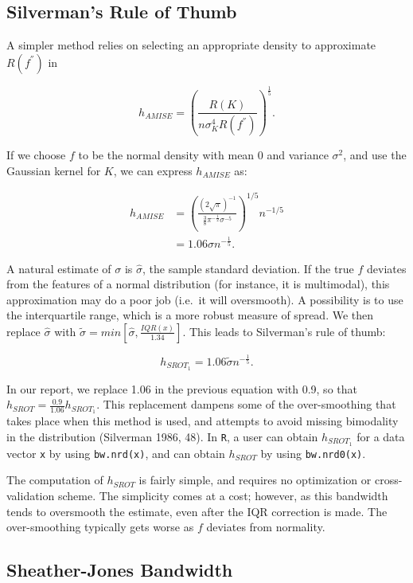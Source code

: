 \documentclass[]{article}
\begin{document}
\subsection{Silverman's Rule of Thumb}\label{silvermans-rule-of-thumb}

A simpler method relies on selecting an appropriate density to
approximate \(R(f^{''})\) in

\[
h_{AMISE} = \left(\frac{R(K)}{n\sigma_K^4R(f^{''})}\right)^{\frac{1}{5}}.
\]

If we choose \(f\) to be the normal density with mean 0 and variance
\(\sigma^2\), and use the Gaussian kernel for \(K\), we can express
\(h_{AMISE}\) as:

\[
\begin{aligned}
h_{AMISE} &= \left(\frac{(2\sqrt{\pi})^{-1}}{\frac{3}{8}\pi^{-\frac{1}{2}}\sigma^{-5}}\right)^{1/5} n^{-1/5} \\
&= 1.06\sigma n^{-\frac{1}{5}}.
\end{aligned}
\]

A natural estimate of \(\sigma\) is \(\hat{\sigma}\), the sample
standard deviation. If the true \(f\) deviates from the features of a
normal distribution (for instance, it is multimodal), this approximation
may do a poor job (i.e.~it will oversmooth). A possibility is to use the
interquartile range, which is a more robust measure of spread. We then
replace \(\hat{\sigma}\) with
\(\tilde{\sigma} = min\left[\hat{\sigma}, \frac{IQR(x)}{1.34}\right]\).
This leads to Silverman's rule of thumb:

\[
h_{SROT_1} = 1.06 \tilde{\sigma} n ^ {-\frac{1}{5}}.
\]

In our report, we replace 1.06 in the previous equation with 0.9, so
that \(h_{SROT} = \frac{0.9}{1.06} h_{SROT_1}\). This replacement
dampens some of the over-smoothing that takes place when this method is
used, and attempts to avoid missing bimodality in the distribution
(Silverman 1986, 48). In \texttt{R}, a user can obtain \(h_{SROT_1}\)
for a data vector \texttt{x} by using \texttt{bw.nrd(x)}, and can obtain
\(h_{SROT}\) by using \texttt{bw.nrd0(x)}.

The computation of \(h_{SROT}\) is fairly simple, and requires no
optimization or cross-validation scheme. The simplicity comes at a cost;
however, as this bandwidth tends to oversmooth the estimate, even after
the IQR correction is made. The over-smoothing typically gets worse as
\(f\) deviates from normality.

\subsection{Sheather-Jones Bandwidth}\label{sheather-jones-bandwidth}
\end{document}
